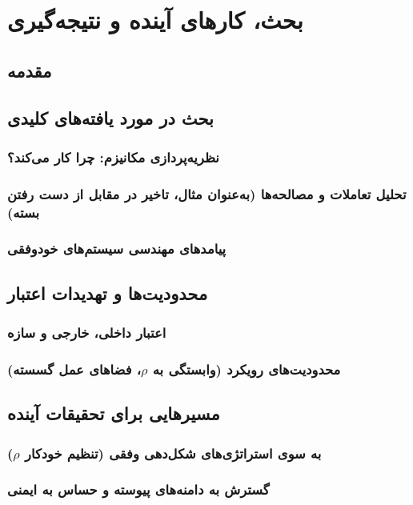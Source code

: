 \documentclass[oneside,openany,phd]{TMU-Thesis}
\begin{document}
\newpage

\chapter{بحث، کارهای آینده و نتیجه‌گیری}
\section{مقدمه}

\section{بحث در مورد یافته‌های کلیدی}
\subsection{نظریه‌پردازی مکانیزم: چرا  کار می‌کند؟}
\subsection{تحلیل تعاملات و مصالحه‌ها (به‌عنوان مثال، تاخیر در مقابل از دست رفتن بسته)}
\subsection{پیامدهای مهندسی سیستم‌های خودوفقی}

\section{محدودیت‌ها و تهدیدات اعتبار}
\subsection{اعتبار داخلی، خارجی و سازه}
\subsection{محدودیت‌های رویکرد  (وابستگی به \texorpdfstring{$\rho$}{rho}، فضاهای عمل گسسته)}

\section{مسیرهایی برای تحقیقات آینده}
\subsection{به سوی استراتژی‌های شکل‌دهی وفقی (تنظیم خودکار \texorpdfstring{$\rho$}{rho})}
\subsection{گسترش  به دامنه‌های پیوسته و حساس به ایمنی}
\end{document}
